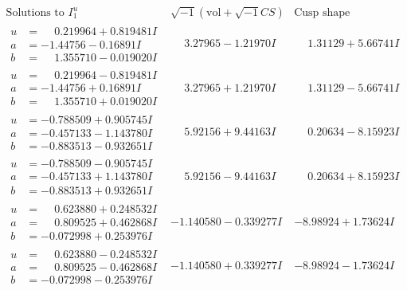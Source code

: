 \documentclass[1p]{elsarticle_modified}
\theoremstyle{definition}
\newcommand{\I}{\sqrt{-1}}
\begin{document}
$$\begin{array}{c|c|c}  
\text{Solutions to }I^u_{1}& \I (\text{vol} + \sqrt{-1}CS) & \text{Cusp shape}\\
 \hline 
\begin{aligned}
u &= \phantom{-}0.219964 + 0.819481 I \\
a &= -1.44756 - 0.16891 I \\
b &= \phantom{-}1.355710 - 0.019020 I\end{aligned}
 & \phantom{-}3.27965 - 1.21970 I & \phantom{-}1.31129 + 5.66741 I \\ \hline\begin{aligned}
u &= \phantom{-}0.219964 - 0.819481 I \\
a &= -1.44756 + 0.16891 I \\
b &= \phantom{-}1.355710 + 0.019020 I\end{aligned}
 & \phantom{-}3.27965 + 1.21970 I & \phantom{-}1.31129 - 5.66741 I \\ \hline\begin{aligned}
u &= -0.788509 + 0.905745 I \\
a &= -0.457133 - 1.143780 I \\
b &= -0.883513 - 0.932651 I\end{aligned}
 & \phantom{-}5.92156 + 9.44163 I & \phantom{-}0.20634 - 8.15923 I \\ \hline\begin{aligned}
u &= -0.788509 - 0.905745 I \\
a &= -0.457133 + 1.143780 I \\
b &= -0.883513 + 0.932651 I\end{aligned}
 & \phantom{-}5.92156 - 9.44163 I & \phantom{-}0.20634 + 8.15923 I \\ \hline\begin{aligned}
u &= \phantom{-}0.623880 + 0.248532 I \\
a &= \phantom{-}0.809525 + 0.462868 I \\
b &= -0.072998 + 0.253976 I\end{aligned}
 & -1.140580 - 0.339277 I & -8.98924 + 1.73624 I \\ \hline\begin{aligned}
u &= \phantom{-}0.623880 - 0.248532 I \\
a &= \phantom{-}0.809525 - 0.462868 I \\
b &= -0.072998 - 0.253976 I\end{aligned}
 & -1.140580 + 0.339277 I & -8.98924 - 1.73624 I \\ \hline\begin{aligned}

\end{aligned}
\end{array}$$
\end{document}
